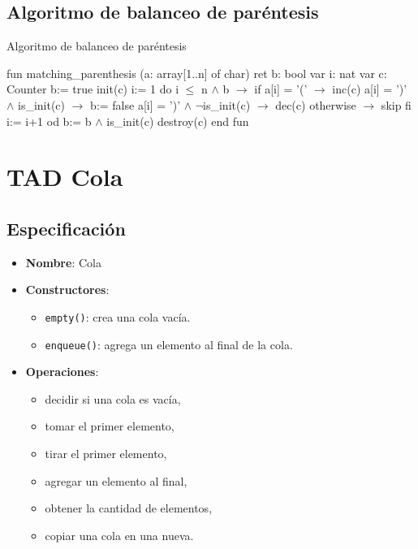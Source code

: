 \subsection{Algoritmo de balanceo de paréntesis}

\begin{codebox}{Algoritmo de balanceo de paréntesis}
\begin{pascallike}
fun matching_parenthesis (a: array[1..n] of char) ret b: bool
    var i: nat
    var c: Counter
    b:= true
    init(c)
    i:= 1
    do i $\leq$ n $\wedge$ b $\rightarrow$ if a[i] = '(' $\rightarrow$ inc(c)
                                    a[i] = ')' $\wedge$ is_init(c) $\rightarrow$ b:= false
                                    a[i] = ')' $\wedge$ $\neg$is_init(c) $\rightarrow$ dec(c)
                                    otherwise $\rightarrow$ skip
                                fi
                                i:= i+1
    od
    b:= b $\wedge$ is_init(c)
    destroy(c)
end fun
\end{pascallike}
\end{codebox}

\section{TAD Cola}

\subsection{Especificación}
\begin{itemize}
    \item \textbf{Nombre}: Cola
    \item \textbf{Constructores}:
    \begin{itemize}
        \item \texttt{empty()}: crea una cola vacía.
        \item \texttt{enqueue()}: agrega un elemento al final de la cola.
    \end{itemize}
    \item \textbf{Operaciones}:
    \begin{itemize}
        \item decidir si una cola es vacía,
        \item tomar el primer elemento,
        \item tirar el primer elemento,
        \item agregar un elemento al final,
        \item obtener la cantidad de elementos,
        \item copiar una cola en una nueva.
    \end{itemize}
\end{itemize}

